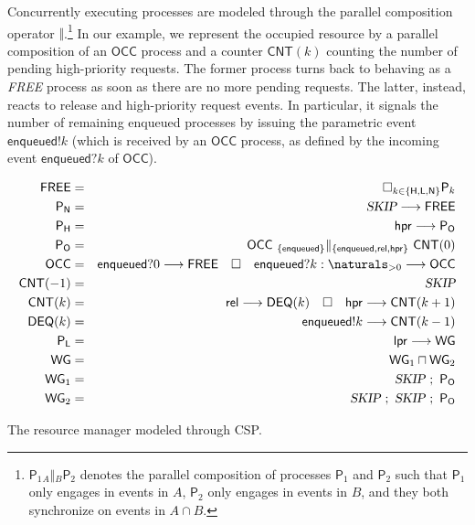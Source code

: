 Concurrently executing processes are modeled through the parallel
composition operator $\Vert$.\footnote{ $\mathsf{P}_1 {_A}\Vert{_B}
  \mathsf{P}_2$ denotes the parallel composition of processes
  $\mathsf{P}_1$ and $\mathsf{P}_2$ such that $\mathsf{P}_1$ only
  engages in events in $A$, $\mathsf{P}_2$ only engages in events in
  $B$, and they both synchronize on events in $A\cap B$.} In our
example, we represent the occupied resource by a parallel composition
of an $\mathsf{OCC}$ process and a counter $\mathsf{CNT}(k)$ counting
the number of pending high-priority requests. The former process turns
back to behaving as a \textsl{FREE} process as soon as there are no
more pending requests.  The latter, instead, reacts to release and
high-priority request events. In particular, it signals the number of
remaining enqueued processes by issuing the parametric event
$\mathsf{enqueued}!k$ (which is received by an $\mathsf{OCC}$ process,
as defined by the incoming event $\mathsf{enqueued}?k$ of
$\mathsf{OCC}$).

\begin{table}[tbh]
\begin{center}
  \begin{eqnarray*}
	 \mathsf{FREE}   &   =   &   \Box_{k \in \{\mathsf{H},\mathsf{L},\mathsf{N}\}} \mathsf{P}_{k}   \\
	 \mathsf{P}_{\mathsf{N}}  &  =  &  \textsl{SKIP} \longrightarrow \mathsf{FREE} \\  
	 \mathsf{P}_{\mathsf{H}}  &  =  &  \mathsf{hpr} \longrightarrow \mathsf{P}_\mathsf{O} \\
	 \mathsf{P}_\mathsf{O}    &  = &  \mathsf{OCC} \ _{\{\mathsf{enqueued}\}}\Vert_{\{\mathsf{enqueued}, \mathsf{rel}, \mathsf{hpr}\}} \  \mathsf{CNT}(0) \\
	 \mathsf{OCC}  &  =  &  \mathsf{enqueued}?0 \longrightarrow \mathsf{FREE} \quad \Box \quad \mathsf{enqueued}?k: \naturals_{> 0} \longrightarrow \mathsf{OCC} \\
	 \mathsf{CNT}(-1)  &  =  &  \textsl{SKIP} \\
	 \mathsf{CNT}(k)  &  =  &  \mathsf{rel} \longrightarrow \mathsf{DEQ}(k) \quad \Box \quad \mathsf{hpr} \longrightarrow \mathsf{CNT}(k+1) \\
	 \mathsf{DEQ}(k)  &  =  &  \mathsf{enqueued}!k \longrightarrow \mathsf{CNT}(k-1) \\
	 \mathsf{P}_{\mathsf{L}}  &  =  &  \mathsf{lpr} \longrightarrow \mathsf{WG} \\
	 \mathsf{WG}  &  =  &  \mathsf{WG}_1 \sqcap \mathsf{WG}_2 \\
	 \mathsf{WG}_1  &  =  &  \textsl{SKIP}\ ;\ \mathsf{P}_\mathsf{O} \\
	 \mathsf{WG}_2  &  =  &  \textsl{SKIP}\ ;\ \textsl{SKIP}\ ;\ \mathsf{P}_\mathsf{O}
  \end{eqnarray*}
\end{center}
\caption{The resource manager modeled through CSP.}
\label{tab:untimedCSP}
\end{table}


